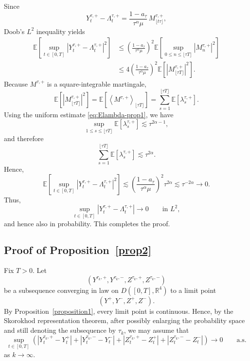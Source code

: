 \documentclass[letterpaper]{article}
\numberwithin{equation}{section}
\theoremstyle{definition}
\theoremstyle{remark}
\newcommand{\E}{\mathbb{E}}
\begin{document}
Since
\[
  Y_t^{\tau,+}-\Lambda_t^{\tau,+}
  =\frac{1-a_\tau}{\tau^\alpha\mu}\,M_{\lfloor t\tau\rfloor}^{\tau,+},
\]
Doob's $L^2$ inequality yields
\begin{align*}
  \E\left[\sup_{t\in[0,T]}|Y_t^{\tau,+}-\Lambda_t^{\tau,+}|^2\right]
  &\le \left(\frac{1-a_\tau}{\tau^\alpha\mu}\right)^2
  \E\left[\sup_{0\le n\le \lfloor\tau T\rfloor}|M_n^{\tau,+}|^2\right]\\
  &\le 4\left(\frac{1-a_\tau}{\tau^\alpha\mu}\right)^2
  \E\left[|M_{\lfloor\tau T\rfloor}^{\tau,+}|^2\right].
\end{align*}
Because $M^{\tau,+}$ is a square-integrable martingale,
\[
  \E\left[\left|M_{\lfloor\tau T\rfloor}^{\tau,+}\right|^2\right]
  =\E\left[\left\langle M^{\tau,+}\right\rangle_{\lfloor\tau T\rfloor}\right]
  =\sum_{s=1}^{\lfloor\tau T\rfloor}\E[\lambda_s^{\tau,+}].
\]
Using the uniform estimate \eqref{eq:Elambda-prop1}, we have
\[
  \sup_{1\le s\le \lfloor\tau T\rfloor}\E[\lambda_s^{\tau,+}]
  \lesssim \tau^{2\alpha-1},
\]
and therefore
\[
  \sum_{s=1}^{\lfloor\tau T\rfloor}\E[\lambda_s^{\tau,+}]
  \lesssim \tau^{2\alpha}.
\]
Hence,
\[
  \E\left[\sup_{t\in[0,T]}\left|Y_t^{\tau,+}-\Lambda_t^{\tau,+}\right|^2\right]
  \lesssim
  \left(\frac{1-a_\tau}{\tau^\alpha\mu}\right)^2\tau^{2\alpha}
  \lesssim \tau^{-2\alpha}\to0.
\]
Thus,
\[
  \sup_{t\in[0,T]}\left|Y_t^{\tau,+}-\Lambda_t^{\tau,+}\right|
  \to 0
  \qquad\text{in }L^2,
\]
and hence also in probability. This completes the proof.

\subsection{Proof of Proposition~\ref{prop2}}\label{app:prop2}

Fix $T>0$. Let
\[
\left(Y^{\tau_k,+},Y^{\tau_k,-},Z^{\tau_k,+},Z^{\tau_k,-}\right)
\]
be a subsequence converging in law on $D([0,T],\mathbb R^4)$ to a limit point
\[
(Y^+,Y^-,Z^+,Z^-).
\]
By Proposition~\ref{proposition1}, every limit point is continuous. Hence, by the
Skorokhod representation theorem, after possibly enlarging the probability space
and still denoting the subsequence by $\tau_k$, we may assume that
\begin{equation}\label{eq:prop2-skorokhod}
\sup_{t\in[0,T]}
\left(
\left|Y_t^{\tau_k,+}-Y_t^+\right|
+
\left|Y_t^{\tau_k,-}-Y_t^-\right|
+
\left|Z_t^{\tau_k,+}-Z_t^+\right|
+
\left|Z_t^{\tau_k,-}-Z_t^-\right|
\right)\to0
\qquad\text{a.s.}
\end{equation}
as $k\to\infty$.
\end{document}
